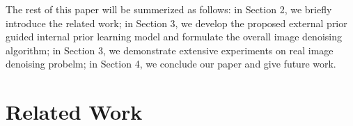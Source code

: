\documentclass[10pt,twocolumn,letterpaper]{article}
\begin{document}
The rest of this paper will be summerized as follows: in Section 2, we briefly introduce the related work; in Section 3, we develop the proposed external prior guided internal prior learning model and formulate the overall image denoising algorithm; in Section 3, we demonstrate extensive experiments on real image denoising probelm; in Section 4, we conclude our paper and give future work.

\section{Related Work}

\begin{figure}\label{fig2}
\centering
{}
\end{figure}
\end{document}
